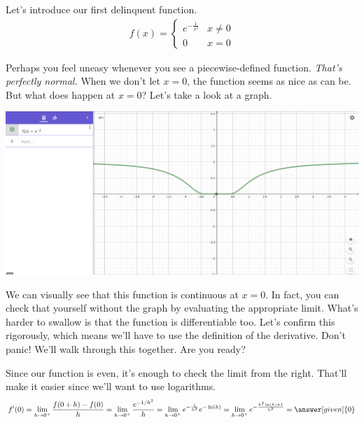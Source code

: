 \documentclass{ximera}
\begin{document}
\begin{exercise}
	
	Let's introduce our first delinquent function.
	\begin{align*}
		f(x)= 
		\begin{cases}
		e^{-\frac{1}{x^2}}  &x \neq 0 \\
		0 &x=0
		\end{cases}
	\end{align*}
	
	Perhaps you feel uneasy whenever you see a piecewise-defined function. \emph{That's perfectly normal.} When we don't let $x=0$, the function seems as nice as can be. But what does happen at $x=0$? Let's take a look at a graph.
	
	\begin{image}
		\includegraphics{graph.png}
	\end{image}
	
	We can visually see that this function is continuous at $x=0$. In fact, you can check that yourself without the graph by evaluating the appropriate limit. What's harder to swallow is that the function is differentiable too. Let's confirm this rigorously, which means we'll have to use the definition of the derivative. Don't panic! We'll walk through this together. Are you ready?
	\begin{multipleChoice}
	\end{multipleChoice}
	
	\begin{exercise}
		
		Since our function is even, it's enough to check the limit from the right. That'll make it easier since we'll want to use logarithms.
		\begin{align*}
			f'(0)= \lim_{h \to 0^+} \frac{f(0+h)-f(0)}{h} = \lim_{h \to 0^+} \frac{e^{-1/h^2}}{h} = \lim_{h \to 0^+} e^{-\frac{1}{h^2}}e^{-\ln(h)} = \lim_{h \to 0^+} e^{-\frac{h^2\ln(h)+1}{h^2}} = \answer[given]{0}
		\end{align*}
		

\end{exercise}
\end{exercise}
\end{document}
